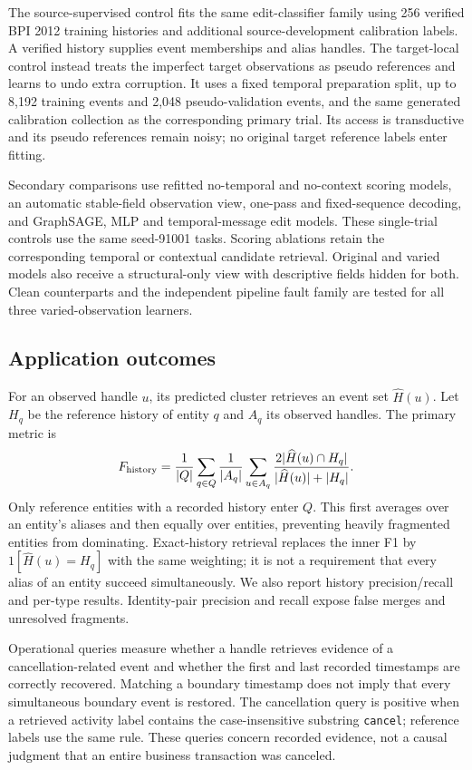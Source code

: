 \documentclass[11pt]{article}
\begin{document}
The source-supervised control fits the same edit-classifier family using 256 verified BPI 2012 training histories and additional source-development calibration labels. A verified history supplies event memberships and alias handles. The target-local control instead treats the imperfect target observations as pseudo references and learns to undo extra corruption. It uses a fixed temporal preparation split, up to 8,192 training events and 2,048 pseudo-validation events, and the same generated calibration collection as the corresponding primary trial. Its access is transductive and its pseudo references remain noisy; no original target reference labels enter fitting.

Secondary comparisons use refitted no-temporal and no-context scoring models, an automatic stable-field observation view, one-pass and fixed-sequence decoding, and GraphSAGE, MLP and temporal-message edit models. These single-trial controls use the same seed-91001 tasks. Scoring ablations retain the corresponding temporal or contextual candidate retrieval. Original and varied models also receive a structural-only view with descriptive fields hidden for both. Clean counterparts and the independent pipeline fault family are tested for all three varied-observation learners.

\subsection{Application outcomes}
For an observed handle $u$, its predicted cluster retrieves an event set $\widehat H(u)$. Let $H_q$ be the reference history of entity $q$ and $A_q$ its observed handles. The primary metric is
\[
 F_{\rm history}=\frac{1}{|Q|}\sum_{q\in Q}\frac{1}{|A_q|}
 \sum_{u\in A_q}\frac{2|\widehat H(u)\cap H_q|}{|\widehat H(u)|+|H_q|}.
\]
Only reference entities with a recorded history enter $Q$. This first averages over an entity's aliases and then equally over entities, preventing heavily fragmented entities from dominating. Exact-history retrieval replaces the inner F1 by $1[\widehat H(u)=H_q]$ with the same weighting; it is not a requirement that every alias of an entity succeed simultaneously. We also report history precision/recall and per-type results. Identity-pair precision and recall expose false merges and unresolved fragments.

Operational queries measure whether a handle retrieves evidence of a cancellation-related event and whether the first and last recorded timestamps are correctly recovered. Matching a boundary timestamp does not imply that every simultaneous boundary event is restored. The cancellation query is positive when a retrieved activity label contains the case-insensitive substring \texttt{cancel}; reference labels use the same rule. These queries concern recorded evidence, not a causal judgment that an entire business transaction was canceled.
\end{document}
